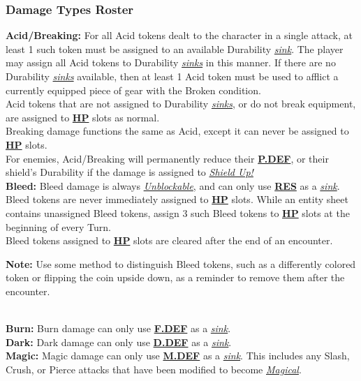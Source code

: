 \documentclass[12pt]{article}
\newcommand{\refto}[1]{\hyperlink{#1}{\textbf{#1}}}
\newcommand{\reftoit}[1]{\hyperlink{#1}{\emph{#1}}}
\begin{document}
\begin{multicols*}{2}
\subsubsection{Damage Types Roster}
\textbf{Acid/Breaking:} For all Acid tokens dealt to the character in a single attack, at least 1 such token must be assigned to an available Durability \reftoit{sink}. The player may assign all Acid tokens to Durability \reftoit{sinks} in this manner. If there are no Durability \reftoit{sinks} available, then at least 1 Acid token must be used to afflict a currently equipped piece of gear with the Broken condition.\\
Acid tokens that are not assigned to Durability \reftoit{sinks}, or do not break equipment, are assigned to \refto{HP} slots as normal.\\
Breaking damage functions the same as Acid, except it can never be assigned to \refto{HP} slots.\\
For enemies, Acid/Breaking will permanently reduce their \refto{P.DEF}, or their shield’s Durability if the damage is assigned to \reftoit{Shield Up!}\\

\textbf{Bleed:} Bleed damage is always \reftoit{Unblockable}, and can only use \refto{RES} as a \reftoit{sink}.\\
Bleed tokens are never immediately assigned to \refto{HP} slots. While an entity sheet contains unassigned Bleed tokens, assign 3 such Bleed tokens to \refto{HP} slots at the beginning of every Turn.\\
Bleed tokens assigned to \refto{HP} slots are cleared after the end of an encounter.

\begin{tcolorbox}
\textbf{Note:} Use some method to distinguish Bleed tokens, such as a differently colored token or flipping the coin upside down, as a reminder to remove them after the encounter.
\end{tcolorbox}
\ \\
\textbf{Burn:} Burn damage can only use \refto{F.DEF} as a \reftoit{sink}.\\

\textbf{Dark:} Dark damage can only use \refto{D.DEF} as a \reftoit{sink}.\\

\textbf{Magic:} Magic damage can only use \refto{M.DEF} as a \reftoit{sink}. This includes any Slash, Crush, or Pierce attacks that have been modified to become \reftoit{Magical}.\\


\end{multicols*}
\end{document}
